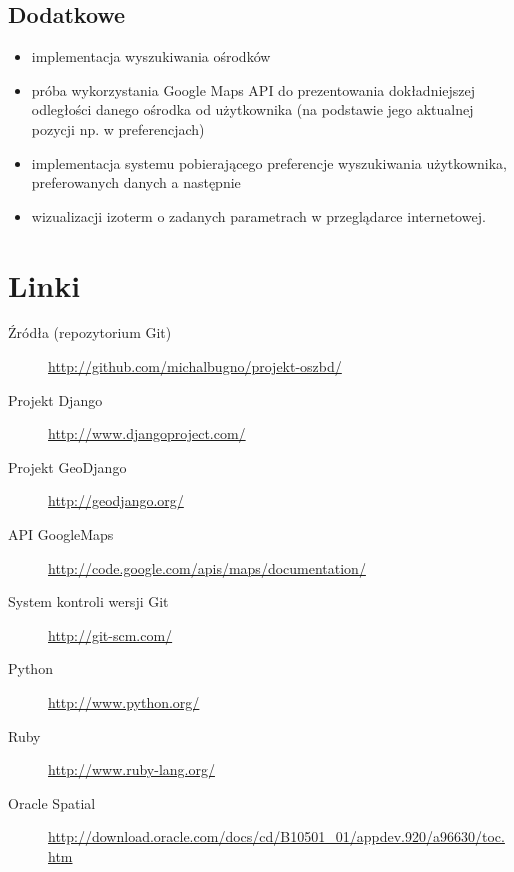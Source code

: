 \documentclass[12pt]{article}
\begin{document}
\subsection{Dodatkowe}
\begin{itemize}
  \item implementacja wyszukiwania ośrodków
  \item próba wykorzystania Google Maps API do prezentowania dokładniejszej odległości danego ośrodka od
        użytkownika (na podstawie jego aktualnej pozycji np. w preferencjach)
  \item implementacja systemu pobierającego preferencje wyszukiwania użytkownika, preferowanych danych a następnie
  \item wizualizacji izoterm o zadanych parametrach w przeglądarce internetowej.
\end{itemize}

\section{Linki}
\begin{description}
  \item[Źródła (repozytorium Git)] \url{http://github.com/michalbugno/projekt-oszbd/}
  \item[Projekt Django] \url{http://www.djangoproject.com/}
  \item[Projekt GeoDjango] \url{http://geodjango.org/}
  \item[API GoogleMaps] \url{http://code.google.com/apis/maps/documentation/}
  \item[System kontroli wersji Git] \url{http://git-scm.com/}
  \item[Python] \url{http://www.python.org/}
  \item[Ruby] \url{http://www.ruby-lang.org/}
  \item[Oracle Spatial] \url{http://download.oracle.com/docs/cd/B10501_01/appdev.920/a96630/toc.htm}
\end{description}
\end{document}
